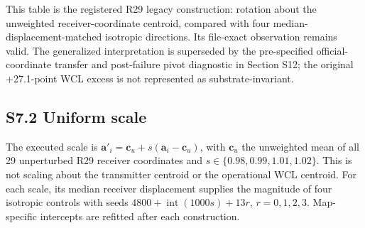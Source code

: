 \documentclass[journal,onecolumn,10pt]{IEEEtran}
\begin{document}
This table is the registered R29 legacy construction: rotation about the unweighted receiver-coordinate centroid, compared with four median-displacement-matched isotropic directions. Its file-exact observation remains valid. The generalized interpretation is superseded by the pre-specified official-coordinate transfer and post-failure pivot diagnostic in Section S12; the original +27.1-point WCL excess is not represented as substrate-invariant.

\subsection*{S7.2 Uniform scale}\label{s7.2-uniform-scale}
The executed scale is $\mathbf a'_i=\mathbf c_u+s(\mathbf a_i-\mathbf c_u)$, with $\mathbf c_u$ the unweighted mean of all 29 unperturbed R29 receiver coordinates and $s\in\{0.98,0.99,1.01,1.02\}$. This is not scaling about the transmitter centroid or the operational WCL centroid. For each scale, its median receiver displacement supplies the magnitude of four isotropic controls with seeds $4800+\operatorname{int}(1000s)+13r$, $r=0,1,2,3$. Map-specific intercepts are refitted after each construction.
\end{document}
